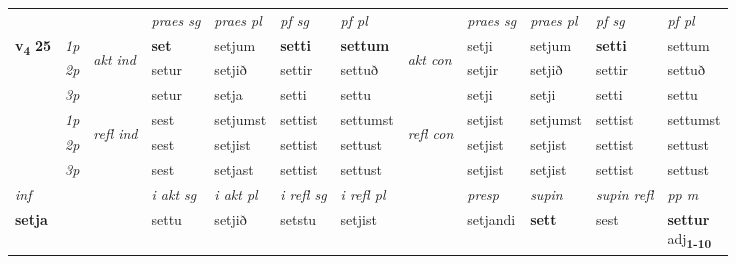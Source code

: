 \begin{longtable}[l]{X>{\footnotesize\itshape}llXXXXlXXXX}
 & &   & \textit{praes sg}  & \textit{praes pl}    & \textit{ pf sg} & \textit{pf pl} & & \textit{praes sg}  & \textit{praes pl}    & \textit{pf sg} & \textit{pf pl }  \\ \cmidrule{4-7} \cmidrule{9-12}
 \multirow{2}{*}{{{\textbf{v{\textsubscript{4}}} \Large{\textbf{25}}}}}  & 1p & \multirow{3}{*}{\begin{turn}{90}\textit{akt ind}\end{turn}} & \textbf{set} & setjum & \textbf{setti} & \textbf{settum} & \multirow{3}{*}{\begin{turn}{90}\textit{akt con}\end{turn}} &setji & setjum & \textbf{setti} & settum\\*
 & 2p &  &  setur  & setjið & settir & settuð & & setjir & setjið & settir & settuð \\*
 & 3p &  & setur & setja & setti & settu & & setji & setji& setti & settu \\*
\cmidrule{4-7} \cmidrule{9-12}
 & 1p & \multirow{3}{*}{\begin{turn}{90}\textit{refl ind}\end{turn}}  & sest & setjumst & settist & settumst & \multirow{3}{*}{\begin{turn}{90}\textit{refl con}\end{turn}}  &setjist & setjumst & settist & settumst \\*
 & 2p &  & sest & setjist & settist & settust & &setjist & setjist & settist & settust \\*
 & 3p  & & sest & setjast & settist & settust & & setjist & setjist& settist & settust \\*
\cmidrule{4-7} \cmidrule{9-12}

   {\textit{inf}} & &  & \textit{i akt sg} & \textit{i akt pl} & \textit{i refl sg} & \textit{i refl pl} && \textit{presp} & \textit{supin} & \textit{supin refl} & \textit{pp m} \\*
  {\textbf{setja}} & && settu  & setjið & setstu & setjist && setjandi &  \textbf{sett} & sest & \specialcell{\textbf{settur} \\ adj\textbf{\textsubscript{1-10}}} \\*

\midrule


\end{longtable}
